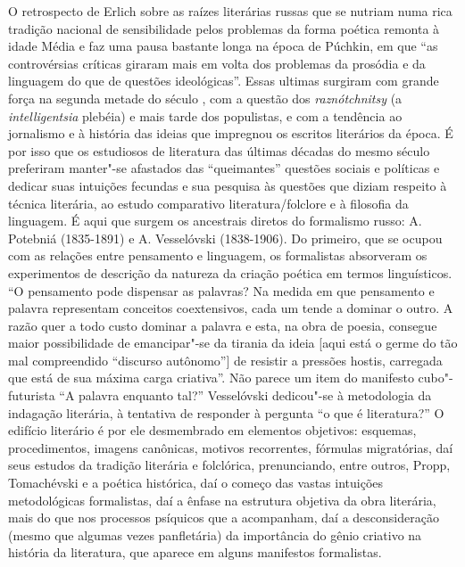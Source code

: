 O retrospecto de Erlich sobre as raízes literárias russas que se nutriam
numa rica tradição nacional de sensibilidade pelos problemas da forma
poética remonta à idade Média e faz uma pausa bastante longa na época de
Púchkin, em que ``as controvérsias críticas giraram mais em volta dos
problemas da prosódia e da linguagem do que de questões ideológicas''.
Essas ultimas surgiram com grande força na segunda metade do século ,
com a questão dos \emph{raznótchnitsy} (a \emph{intelligentsia} plebéia)
e mais tarde dos populistas, e com a tendência ao jornalismo e à
história das ideias que impregnou os escritos literários da época. É por
isso que os estudiosos de literatura das últimas décadas do mesmo século
preferiram manter"-se afastados das ``queimantes'' questões sociais e políticas e
dedicar suas intuições fecundas e sua pesquisa às questões que diziam
respeito à técnica literária, ao estudo comparativo literatura/folclore
e à filosofia da linguagem. É aqui que surgem os ancestrais diretos do
formalismo russo: A. Potebniá (1835-1891) e A. Vesselóvski (1838-1906).
Do primeiro, que se ocupou com as relações entre pensamento e linguagem,
os formalistas absorveram os experimentos de descrição da natureza da
criação poética em termos linguísticos. ``O pensamento pode dispensar as
palavras? Na medida em que pensamento e palavra
representam conceitos coextensivos, cada um tende a dominar o outro. A
razão quer a todo custo dominar a palavra e esta, na obra de poesia,
consegue maior possibilidade de emancipar"-se da tirania da ideia {[}aqui
está o germe do tão mal compreendido ``discurso autônomo''{]} de
resistir a pressões hostis, carregada que está de sua máxima carga
criativa''. Não parece um item do manifesto cubo"-futurista ``A palavra enquanto
tal?'' Vesselóvski dedicou"-se à metodologia da indagação literária, à
tentativa de responder à pergunta ``o que é literatura?'' O edifício
literário é por ele desmembrado em elementos objetivos: esquemas,
procedimentos, imagens canônicas, motivos recorrentes, fórmulas
migratórias, daí seus estudos da tradição literária e folclórica,
prenunciando, entre outros, Propp, Tomachévski e a poética histórica,
daí o começo das vastas intuições metodológicas formalistas, daí a
ênfase na estrutura objetiva da obra literária, mais do que nos
processos psíquicos que a acompanham, daí a desconsideração (mesmo que
algumas vezes panfletária) da importância do gênio criativo na
história da literatura, que aparece em alguns manifestos formalistas.

